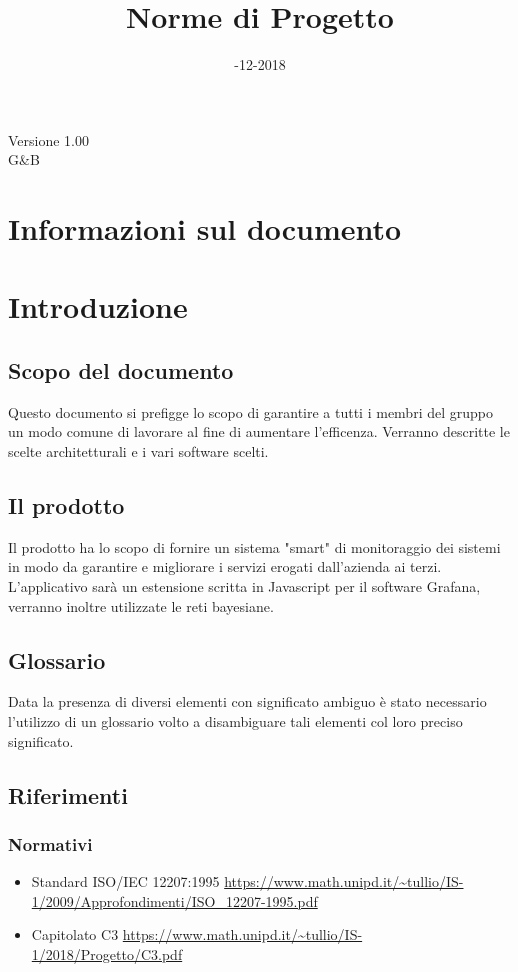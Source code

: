 \documentclass{article}
\title{\myfont Norme di Progetto}
\date{\myfont 04-12-2018}
\begin{document}
  \maketitle
  \begin{center}
  \huge Versione 1.00 
  \\G\&B
  \end{center}
  \newpage
  \tableofcontents
  \newpage

\section*{Informazioni sul documento}


\section{Introduzione}
    \subsection{Scopo del documento}
    Questo documento si prefigge lo scopo di garantire a tutti i membri del gruppo un modo comune di lavorare al fine di aumentare l'efficenza. Verranno descritte le scelte architetturali e i vari software scelti.
    \subsection{Il prodotto}
    Il prodotto ha lo scopo di fornire un sistema "smart" di monitoraggio dei sistemi in modo da garantire e migliorare i servizi erogati dall'azienda ai terzi. L'applicativo sarà un estensione scritta in Javascript per il software Grafana, verranno inoltre utilizzate le reti bayesiane.
    \subsection{Glossario}
    Data la presenza di diversi elementi con significato ambiguo è stato necessario l'utilizzo di un glossario volto a disambiguare tali elementi col loro preciso significato.
    \subsection{Riferimenti}
    \subsubsection{Normativi}
    \begin{itemize}
        \item Standard ISO/IEC 12207:1995 \newline \url{https://www.math.unipd.it/~tullio/IS-1/2009/Approfondimenti/ISO_12207-1995.pdf}
        \item Capitolato C3 \newline \url{https://www.math.unipd.it/~tullio/IS-1/2018/Progetto/C3.pdf}
    \end{itemize}
\end{document}

